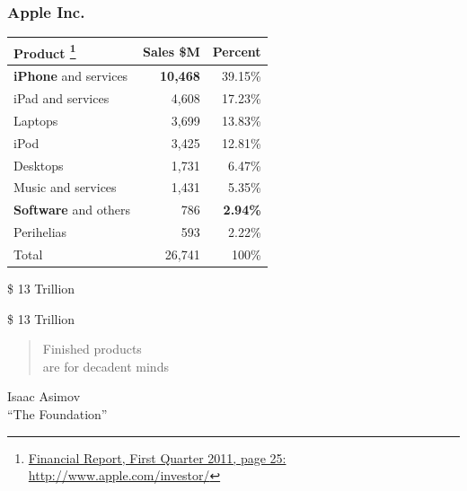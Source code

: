 \documentclass[18pt]{beamer}
\begin{document}
{
\begin{frame}
\frametitle{Apple Inc.}

\begin{center}
\begin{tabular}{lrr}
\hline
\textbf{Product}
\footnote{
\href{http://phx.corporate-ir.net/External.File?item=UGFyZW50SUQ9NzgwODJ8Q2hpbGRJRD0tMXxUeXBlPTM=&t=1}
{Financial Report, First Quarter 2011, page 25:}
 \url{http://www.apple.com/investor/} }
& \textbf{Sales \$M}
& \textbf{Percent} \\
\hline
\hline
\textbf{iPhone} and services & \textbf{10,468} &  39.15\%  \\
iPad and services & 4,608 & 17.23\% \\
Laptops & 3,699 & 13.83\% \\
iPod & 3,425 & 12.81\% \\
Desktops & 1,731 & 6.47\% \\
Music and services & 1,431 & 5.35\%  \\
\textbf{Software} and others &  786 & \textbf{2.94\%} \\
Perihelias &  593 & 2.22\% \\
\hline
Total &  26,741 & 100\% \\
\end{tabular}

\end{center}
\end{frame}
}


{
\begin{frame}[plain]
\fontsize{72pt}{90pt}\selectfont
\center
\begin{center}
\$ 13 Trillion
\end{center}
\end{frame}
}

{
\begin{frame}[plain]
\Huge
\center
\begin{center}
\$ 13 Trillion
\end{center}
\end{frame}
}


\begin{frame}[plain]
\fontsize{30pt}{30pt}\selectfont
\center
\begin{quote}
Finished products\\
are for decadent minds
\end{quote}
\bigskip
\fontsize{18pt}{18pt}\selectfont
\begin{flushright}
Isaac Asimov\\
``The Foundation''
\end{flushright}
\end{frame}
\end{document}
